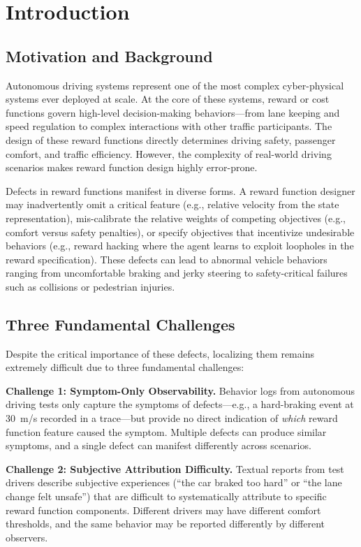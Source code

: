 \documentclass[conference]{IEEEtran}
\theoremstyle{plain}
\begin{document}
\section{Introduction}
\label{sec:intro}

\subsection{Motivation and Background}

Autonomous driving systems represent one of the most complex cyber-physical systems ever deployed at scale. At the core of these systems, reward or cost functions govern high-level decision-making behaviors---from lane keeping and speed regulation to complex interactions with other traffic participants. The design of these reward functions directly determines driving safety, passenger comfort, and traffic efficiency. However, the complexity of real-world driving scenarios makes reward function design highly error-prone.

Defects in reward functions manifest in diverse forms. A reward function designer may inadvertently omit a critical feature (e.g., relative velocity from the state representation), mis-calibrate the relative weights of competing objectives (e.g., comfort versus safety penalties), or specify objectives that incentivize undesirable behaviors (e.g., reward hacking where the agent learns to exploit loopholes in the reward specification). These defects can lead to abnormal vehicle behaviors ranging from uncomfortable braking and jerky steering to safety-critical failures such as collisions or pedestrian injuries.

\subsection{Three Fundamental Challenges}

Despite the critical importance of these defects, localizing them remains extremely difficult due to three fundamental challenges:

\textbf{Challenge 1: Symptom-Only Observability.} Behavior logs from autonomous driving tests only capture the symptoms of defects---e.g., a hard-braking event at 30~m/s recorded in a trace---but provide no direct indication of \emph{which} reward function feature caused the symptom. Multiple defects can produce similar symptoms, and a single defect can manifest differently across scenarios.

\textbf{Challenge 2: Subjective Attribution Difficulty.} Textual reports from test drivers describe subjective experiences (``the car braked too hard'' or ``the lane change felt unsafe'') that are difficult to systematically attribute to specific reward function components. Different drivers may have different comfort thresholds, and the same behavior may be reported differently by different observers.
\end{document}
